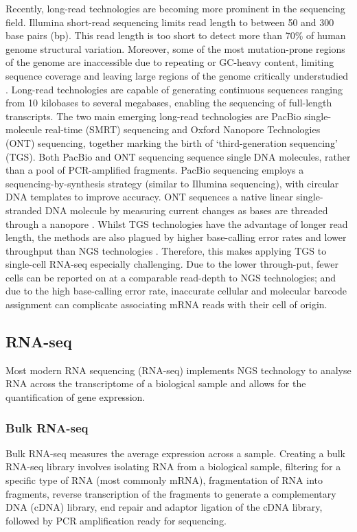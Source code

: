 Recently, long-read technologies are becoming more prominent in the sequencing field.
Illumina short-read sequencing limits read length to between 50 and 300 base pairs (bp)\@.
This read length is too short to detect more than 70\% of human genome structural variation.
Moreover, some of the most mutation-prone regions of the genome are inaccessible due to repeating or GC-heavy content, limiting sequence coverage and leaving large regions of the genome critically understudied \cite{logsdon2020long}.
Long-read technologies are capable of generating continuous sequences ranging from 10 kilobases to several megabases, enabling the sequencing of full-length transcripts.
The two main emerging long-read technologies are PacBio single-molecule real-time (SMRT) sequencing\cite{wenger2019accurate} and Oxford Nanopore Technologies (ONT) sequencing\cite{ip2015minion, jain2016oxford}, together marking the birth of `third-generation sequencing' (TGS).
Both PacBio and ONT sequencing sequence single DNA molecules, rather than a pool of PCR-amplified fragments.
PacBio sequencing employs a sequencing-by-synthesis strategy (similar to Illumina sequencing), with circular DNA templates to improve accuracy.
ONT sequences a native linear single-stranded DNA molecule by measuring current changes as bases are threaded through a nanopore \cite{weirather2017comprehensive}.
Whilst TGS technologies have the advantage of longer read length, the methods are also plagued by higher base-calling error rates and lower throughput than NGS technologies \cite{weirather2017comprehensive, philpott2021nanopore}.
Therefore, this makes applying TGS to single-cell RNA-seq especially challenging.
Due to the lower through-put, fewer cells can be reported on at a comparable read-depth to NGS technologies;
and due to the high base-calling error rate, inaccurate cellular and molecular barcode assignment can complicate associating mRNA reads with their cell of origin.

\subsection{RNA-seq}\label{subsec:rna-seq-intro}
Most modern RNA sequencing (RNA-seq) implements NGS technology to analyse RNA across the transcriptome of a biological sample and allows for the quantification of gene expression.

\subsubsection{Bulk RNA-seq}
Bulk RNA-seq measures the average expression across a sample.
Creating a bulk RNA-seq library involves isolating RNA from a biological sample, filtering for a specific type of RNA (most commonly mRNA), fragmentation of RNA into fragments, reverse transcription of the fragments to generate a complementary DNA (cDNA) library, end repair and adaptor ligation of the cDNA library, followed by PCR amplification ready for sequencing.

